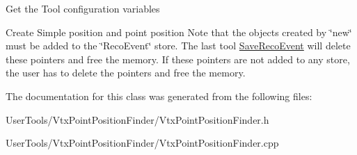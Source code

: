 Get the Tool configuration variables

Create Simple position and point position Note that the objects created by \char`\"{}new\char`\"{} must be added to the \char`\"{}RecoEvent\char`\"{} store. The last tool \hyperlink{classSaveRecoEvent}{SaveRecoEvent} will delete these pointers and free the memory. If these pointers are not added to any store, the user has to delete the pointers and free the memory. 

The documentation for this class was generated from the following files:\begin{DoxyCompactItemize}
\item 
UserTools/VtxPointPositionFinder/VtxPointPositionFinder.h\item 
UserTools/VtxPointPositionFinder/VtxPointPositionFinder.cpp\end{DoxyCompactItemize}
